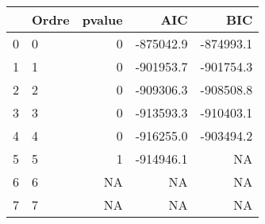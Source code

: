 \begin{tabular}{l|l|r|r|r}
\hline
  & Ordre & pvalue & AIC & BIC\\
\hline
0 & 0 & 0 & -875042.9 & -874993.1\\
\hline
1 & 1 & 0 & -901953.7 & -901754.3\\
\hline
2 & 2 & 0 & -909306.3 & -908508.8\\
\hline
3 & 3 & 0 & -913593.3 & -910403.1\\
\hline
4 & 4 & 0 & -916255.0 & -903494.2\\
\hline
5 & 5 & 1 & -914946.1 & NA\\
\hline
6 & 6 & NA & NA & NA\\
\hline
7 & 7 & NA & NA & NA\\
\hline
\end{tabular}
